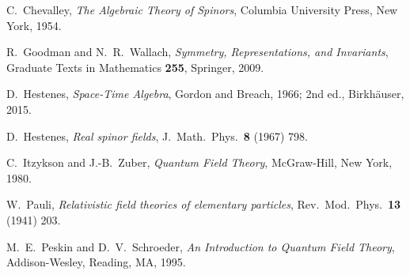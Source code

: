  C.~Chevalley, \emph{The Algebraic Theory of Spinors}, Columbia University Press, New York, 1954.

 R.~Goodman and N.~R.~Wallach, \emph{Symmetry, Representations, and Invariants}, Graduate Texts in Mathematics \textbf{255}, Springer, 2009.

 D.~Hestenes, \emph{Space-Time Algebra}, Gordon and Breach, 1966; 2nd ed., Birkh\"auser, 2015.

 D.~Hestenes, \emph{Real spinor fields}, J.~Math.~Phys.~\textbf{8} (1967) 798.

 C.~Itzykson and J.-B.~Zuber, \emph{Quantum Field Theory}, McGraw-Hill, New York, 1980.

 W.~Pauli, \emph{Relativistic field theories of elementary particles}, Rev.~Mod.~Phys.~\textbf{13} (1941) 203.

 M.~E.~Peskin and D.~V.~Schroeder, \emph{An Introduction to Quantum Field Theory}, Addison-Wesley, Reading, MA, 1995.

